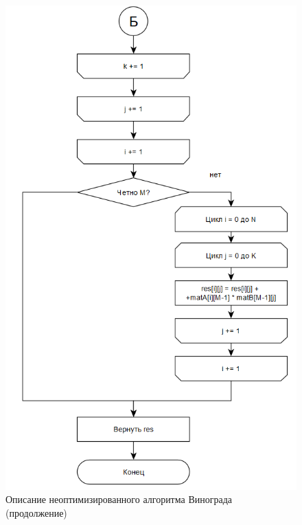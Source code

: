 \documentclass{article}
\begin{document}
\begin{figure}[h]
	\centering
	\includegraphics[scale=1]{tools/alg_2_1.png}
	\caption{Описание неоптимизированного алгоритма Винограда (продолжение)}
	\label{fig:vinograd_2}
\end{figure}
\end{document}
